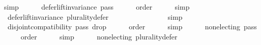 \begin{isabellebody}
\ simp\ \isanewline
\isanewline
\ \ \isamarkupfalse%
\ {}{}{}{}{\isacharcolon}{\kern0pt}\ {\isachardoublequoteopen}defer{\isacharunderscore}{\kern0pt}lift{\isacharunderscore}{\kern0pt}invariance\ {\isacharquery}{\kern0pt}pass{}{\isachardoublequoteclose}\isanewline
\ \ \ \ \isamarkupfalse%
\ order\isanewline
\ \ \ \ \isamarkupfalse%
\ simp\ \isanewline
\ \ \isamarkupfalse%
\ {}{}{}{}{\isacharcolon}{\kern0pt}\ {\isachardoublequoteopen}defer{\isacharunderscore}{\kern0pt}lift{\isacharunderscore}{\kern0pt}invariance\ {\isacharquery}{\kern0pt}plurality{\isacharunderscore}{\kern0pt}defer{\isachardoublequoteclose}\isanewline
\ \ \ \ \isamarkupfalse%
\ {}{}{}{}{}\ {}{}{}{}{}\ {}{}{}{}{}\ {}{}{}{}{}\ {}{}{}{}{}\isanewline
\ \ \ \ \isamarkupfalse%
\ simp\ \isanewline
\ \ \isamarkupfalse%
\ {}{}{}{}{\isacharcolon}{\kern0pt}\ {\isachardoublequoteopen}disjoint{\isacharunderscore}{\kern0pt}compatibility\ {\isacharquery}{\kern0pt}pass{}\ {\isacharquery}{\kern0pt}drop{}{\isachardoublequoteclose}\isanewline
\ \ \ \ \isamarkupfalse%
\ order\isanewline
\ \ \ \ \isamarkupfalse%
\ simp\ \isanewline
\ \ \isamarkupfalse%
\ {}{}{}{}{\isacharcolon}{\kern0pt}\ {\isachardoublequoteopen}non{\isacharunderscore}{\kern0pt}electing\ {\isacharquery}{\kern0pt}pass{}{\isachardoublequoteclose}\isanewline
\ \ \ \ \isamarkupfalse%
\ order\isanewline
\ \ \ \ \isamarkupfalse%
\ simp\ \isanewline
\ \ \isamarkupfalse%
\ {}{}{}{}{\isacharcolon}{\kern0pt}\ {\isachardoublequoteopen}non{\isacharunderscore}{\kern0pt}electing\ {\isacharquery}{\kern0pt}plurality{\isacharunderscore}{\kern0pt}defer{\isachardoublequoteclose}\isanewline
\ \ \ \ \isamarkupfalse%
\ {}{}{}{}{}\ {}{}{}{}{}\isanewline

\end{isabellebody}
